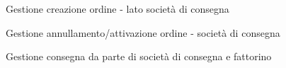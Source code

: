 \documentclass[11pt]{article} %
\begin{document}
\begin{figure}[!ht]
\begin{center}
\caption{Gestione creazione ordine - lato società di consegna}
\end{center}
\end{figure}

\begin{figure}[!ht]
\begin{center}
\caption{Gestione annullamento/attivazione ordine - società di consegna}
\end{center}
\end{figure}

\begin{figure}[!ht]
\begin{center}
\caption{Gestione consegna da parte di società di consegna e fattorino}
\end{center}
\end{figure}
\end{document}
